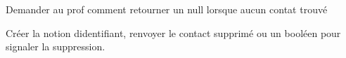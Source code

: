 
\begin{DoxyRefList}
\item[Membre \mbox{\hyperlink{class_gestion_contact_aed9c969df00ec0ac22d8bf9513e0e8ed}{Gestion\+Contact\+::remove\+Contact}} (const std\+::string \&)]\label{todo__todo000001}%
%
Demander au prof comment retourner un null lorsque aucun contat trouvé 

\label{todo__todo000002}%
%
Créer la notion d\textquotesingle{}identifiant, renvoyer le contact supprimé ou un booléen pour signaler la suppression. 
\end{DoxyRefList}